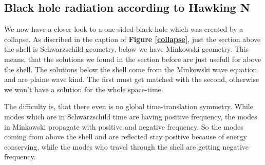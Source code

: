 \subsection{Black hole radiation according to Hawking N} 
	We now have a closer look to a one-sided black hole which was created by a collapse. As discribed in the caption of \textbf{Figure \ref{collapse}}, just the section above the shell is Schwarzschild geometry, below we have Minkowski geometry. This means, that the solutions we found in the section before are just usefull for above the shell. The solutions below the shell come from the Minkowski wave equation and are plaine wave kind. The first must get matched with the second, otherwise we won't have a solution for the whole space-time.
	
	The difficulty is, that there even is no global time-translation symmetry. While modes which are in Schwarzschild time are having positive frequency, the modes in Minkowski propagate with positive and negative frequency. So the modes coming from above the shell and are reflected stay positive because of energy conserving, while the modes who travel through the shell are getting negative frequency. 
	
